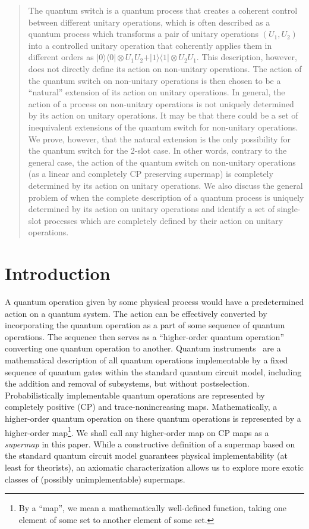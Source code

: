 \documentclass[a4paper,twocolumn,accepted=2022-10-23]{quantumarticle}
\newcommand{\proj}[1]{\vert {#1} \rangle\!\langle {#1} \vert}
\theoremstyle{definition}
\begin{document}
\begin{abstract}
The quantum switch is a quantum process that creates a coherent control between different unitary operations, which is often described as a quantum process which transforms a pair of unitary operations $(U_1 , U_2)$ into a controlled unitary operation that coherently applies them in different orders as $\proj{0} \otimes U_1 U_2 + \proj{1} \otimes U_2 U_1$.
This description, however, does not directly define its action on non-unitary operations.
The action of the quantum switch on non-unitary operations is then chosen to be a ``natural'' extension of its action on unitary operations.  In general, the action of a process on non-unitary operations is not uniquely determined by its action on unitary operations.  It may be that there could be a set of inequivalent extensions of the quantum switch for non-unitary operations.
We prove, however, that the natural extension is the only possibility for the quantum switch for the 2-slot case.
In other words, contrary to the general case, the action of the quantum switch on non-unitary operations (as a linear and completely CP preserving supermap) is completely determined by its action on unitary operations.
We also discuss the general problem of when the complete description of a quantum process is uniquely determined by its action on unitary operations and identify a set of single-slot processes which are completely defined by their action on unitary operations.
\end{abstract}


\section{Introduction}
A quantum operation given by some physical process would have a predetermined action on a quantum system.
The action can be effectively converted by incorporating the quantum operation as a part of some sequence of quantum operations.
The sequence then serves as a ``higher-order quantum operation'' converting one quantum operation to another.
Quantum instruments~\cite{ozawa83} are a mathematical description of all quantum operations implementable by a fixed sequence of quantum gates within the standard quantum circuit model, including the addition and removal of subsystems, but without postselection.
Probabilistically implementable quantum operations are represented by completely positive (CP) and trace-nonincreasing maps.
Mathematically, a higher-order quantum operation on these quantum operations is represented by a higher-order map\footnote{By a ``map'', we mean a mathematically well-defined function, taking one element of some set to another element of some set.}.
We shall call any higher-order map on CP maps as a \textit{supermap} in this paper.
While a constructive definition of a supermap based on the standard quantum circuit model guarantees physical implementability (at least for theorists), an axiomatic characterization allows us to explore more exotic classes of (possibly unimplementable) supermaps.
\end{document}
